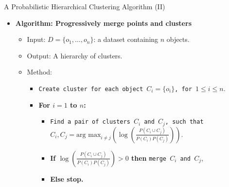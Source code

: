 \begin{frame}{A Probabilistic Hierarchical Clustering Algorithm (II)}
	\centering
	\begin{itemize}
		\item \textbf{Algorithm: Progressively merge points and clusters}
		      \begin{itemize}
			      \item Input: $D = \{o_1, \ldots, o_n\}$: a dataset containing $n$
			            objects.
			      \item Output: A hierarchy of clusters.
			      \item Method:
			            \begin{itemize}
				            \item \texttt{Create cluster for each object $C_i = \{o_i\}$,
					                  for $1 \leq i \leq n$}.
				            \item \textbf{For $i=1$ to $n$:}
				                  \begin{itemize}
					                  \item \texttt{Find a pair of clusters $C_i$ and $C_j$, such
						                        that}\\
					                        $C_i, C_j = \text{arg max}_{i \neq j} \left( \log\left(
							                        \frac{P(C_i \cup C_j)}{P(C_i)P(C_j)} \right) \right)$.
					                  \item \textbf{If $\log\left( \frac{P(C_i \cup
								                        C_j)}{P(C_i)P(C_j)}\right) > 0$ then} \texttt{merge $C_i$
						                        and $C_j$},
					                  \item \textbf{Else stop.}
				                  \end{itemize}
			            \end{itemize}
		      \end{itemize}
	\end{itemize}
\end{frame}
